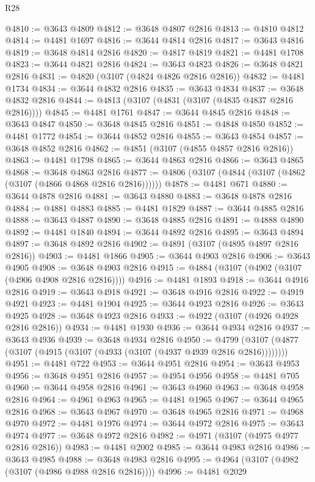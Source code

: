 \begin{lexlean}{R28}
\begin{coremodule}
@4810 := @3643 @4809
@4812 := @3648 @4807 @2816
@4813 := @4810 @4812
@4814 := @4481 @1697
@4816 := @3644 @4814 @2816
@4817 := @3643 @4816
@4819 := @3648 @4814 @2816
@4820 := @4817 @4819
@4821 := @4481 @1708
@4823 := @3644 @4821 @2816
@4824 := @3643 @4823
@4826 := @3648 @4821 @2816
@4831 := @4820 (@3107 (@4824 @4826 @2816 @2816))
@4832 := @4481 @1734
@4834 := @3644 @4832 @2816
@4835 := @3643 @4834
@4837 := @3648 @4832 @2816
@4844 := @4813 (@3107 (@4831 (@3107 (@4835 @4837 @2816 @2816))))
@4845 := @4481 @1761
@4847 := @3644 @4845 @2816
@4848 := @3643 @4847
@4850 := @3648 @4845 @2816
@4851 := @4848 @4850
@4852 := @4481 @1772
@4854 := @3644 @4852 @2816
@4855 := @3643 @4854
@4857 := @3648 @4852 @2816
@4862 := @4851 (@3107 (@4855 @4857 @2816 @2816))
@4863 := @4481 @1798
@4865 := @3644 @4863 @2816
@4866 := @3643 @4865
@4868 := @3648 @4863 @2816
@4877 := @4806 (@3107 (@4844 (@3107 (@4862 (@3107 (@4866 @4868 @2816 @2816))))))
@4878 := @4481 @671
@4880 := @3644 @4878 @2816
@4881 := @3643 @4880
@4883 := @3648 @4878 @2816
@4884 := @4881 @4883
@4885 := @4481 @1829
@4887 := @3644 @4885 @2816
@4888 := @3643 @4887
@4890 := @3648 @4885 @2816
@4891 := @4888 @4890
@4892 := @4481 @1840
@4894 := @3644 @4892 @2816
@4895 := @3643 @4894
@4897 := @3648 @4892 @2816
@4902 := @4891 (@3107 (@4895 @4897 @2816 @2816))
@4903 := @4481 @1866
@4905 := @3644 @4903 @2816
@4906 := @3643 @4905
@4908 := @3648 @4903 @2816
@4915 := @4884 (@3107 (@4902 (@3107 (@4906 @4908 @2816 @2816))))
@4916 := @4481 @1893
@4918 := @3644 @4916 @2816
@4919 := @3643 @4918
@4921 := @3648 @4916 @2816
@4922 := @4919 @4921
@4923 := @4481 @1904
@4925 := @3644 @4923 @2816
@4926 := @3643 @4925
@4928 := @3648 @4923 @2816
@4933 := @4922 (@3107 (@4926 @4928 @2816 @2816))
@4934 := @4481 @1930
@4936 := @3644 @4934 @2816
@4937 := @3643 @4936
@4939 := @3648 @4934 @2816
@4950 := @4799 (@3107 (@4877 (@3107 (@4915 (@3107 (@4933 (@3107 (@4937 @4939 @2816 @2816))))))))
@4951 := @4481 @722
@4953 := @3644 @4951 @2816
@4954 := @3643 @4953
@4956 := @3648 @4951 @2816
@4957 := @4954 @4956
@4958 := @4481 @705
@4960 := @3644 @4958 @2816
@4961 := @3643 @4960
@4963 := @3648 @4958 @2816
@4964 := @4961 @4963
@4965 := @4481 @1965
@4967 := @3644 @4965 @2816
@4968 := @3643 @4967
@4970 := @3648 @4965 @2816
@4971 := @4968 @4970
@4972 := @4481 @1976
@4974 := @3644 @4972 @2816
@4975 := @3643 @4974
@4977 := @3648 @4972 @2816
@4982 := @4971 (@3107 (@4975 @4977 @2816 @2816))
@4983 := @4481 @2002
@4985 := @3644 @4983 @2816
@4986 := @3643 @4985
@4988 := @3648 @4983 @2816
@4995 := @4964 (@3107 (@4982 (@3107 (@4986 @4988 @2816 @2816))))
@4996 := @4481 @2029

\end{coremodule}
\end{lexlean}
